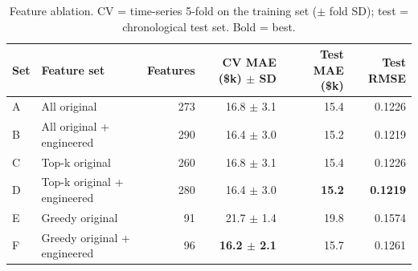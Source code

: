 \begin{table}[t]
\centering
\small
\begin{tabular}{llrrrr}
\toprule
Set & Feature set & Features & CV MAE (\$k) $\pm$ SD & Test MAE (\$k) & Test RMSE \\
\midrule
A & All original & 273 & 16.8 $\pm$ 3.1 & 15.4 & 0.1226 \\
B & All original + engineered & 290 & 16.4 $\pm$ 3.0 & 15.2 & 0.1219 \\
C & Top-k original & 260 & 16.8 $\pm$ 3.1 & 15.4 & 0.1226 \\
D & Top-k original + engineered & 280 & 16.4 $\pm$ 3.0 & \textbf{15.2} & \textbf{0.1219} \\
E & Greedy original & 91 & 21.7 $\pm$ 1.4 & 19.8 & 0.1574 \\
F & Greedy original + engineered & 96 & \textbf{16.2 $\pm$ 2.1} & 15.7 & 0.1261 \\
\bottomrule
\end{tabular}
\caption{Feature ablation. CV = time-series 5-fold on the training set ($\pm$ fold SD); test = chronological test set. Bold = best.}
\label{tab:ablation}
\end{table}
